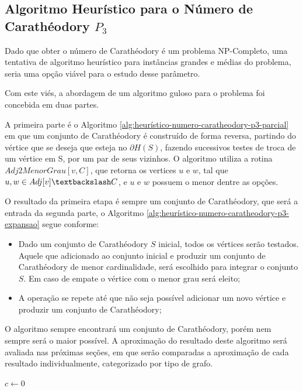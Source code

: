 \subsection{Algoritmo Heurístico para o Número de Carathéodory $P_3$}

Dado que obter o número de Carathéodory é um problema NP-Completo,
uma tentativa de algoritmo heurístico para instâncias grandes e médias do problema,
seria uma opção viável para o estudo desse parâmetro.

Com este viés, a abordagem de um algoritmo guloso para o problema foi concebida em duas partes.

A primeira parte é o Algoritmo \ref{alg:heurístico-numero-caratheodory-p3-parcial} em que um conjunto de Carathéodory é construído de forma reversa,
partindo do vértice que se deseja que esteja no $\partial H(S)$,
fazendo sucessivos testes de troca de um vértice em S, 
por um par de seus vizinhos. 
O algoritmo utiliza a rotina $Adj2MenorGrau[v,C]$, que retorna os vertices $u$ e $w$,
tal que $u,w\in Adj[v] \textbackslash C$, e $u$ e $w$ possuem o menor dentre as opções.

O resultado da primeira etapa é sempre um conjunto de Carathéodory,
que será a entrada da segunda parte, o Algoritmo \ref{alg:heurístico-numero-caratheodory-p3-expansao} segue conforme: 
\begin{itemize}
    \item{Dado um conjunto de Carathéodory $S$ inicial, todos os vértices serão testados. 
    Aquele que adicionado ao conjunto inicial e produzir um conjunto de Carathéodory de menor cardinalidade,
    será escolhido para integrar o conjunto $S$. Em caso de empate o vértice com o menor grau será eleito;}
    \item{A operação se repete até que não seja possível adicionar um novo vértice e produzir um conjunto de Carathéodory;}
\end{itemize}

O algoritmo sempre encontrará um conjunto de Carathéodory,
porém nem sempre será o maior possível.
A aproximação do resultado deste algoritmo será avaliada nas próximas seções,
em que serão comparadas a aproximação de cada resultado individualmente,
categorizado por tipo de grafo. 

\begin{algorithm2e}
    \SetAlFnt{\tiny}
    \SetAlCapFnt{\small}
    \SetAlCapNameFnt{\small}
    \SetAlgoLined
    \DontPrintSemicolon
    \LinesNumbered
    \SetAlgoLined
    \BlankLine
    \BlankLine
    $c \gets 0$\\
\caption{$HeurísticoNCaratheodory(G(V,E))$}
\label{alg:heurístico-numero-caratheodory-p3}
\end{algorithm2e}

